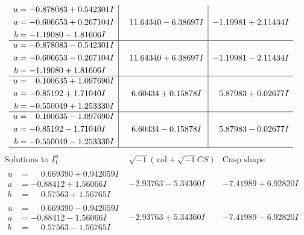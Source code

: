 \documentclass[1p]{elsarticle_modified}
\theoremstyle{definition}
\newcommand{\I}{\sqrt{-1}}
\begin{document}
$$\begin{array}{c|c|c}
\begin{aligned}
u &= -0.878083 + 0.542301 I \\
a &= -0.606653 + 0.267104 I \\
b &= -1.19080 - 1.81606 I\end{aligned}
 & \phantom{-}11.64340 - 6.38697 I & -1.19981 + 2.11434 I \\ \hline\begin{aligned}
u &= -0.878083 - 0.542301 I \\
a &= -0.606653 - 0.267104 I \\
b &= -1.19080 + 1.81606 I\end{aligned}
 & \phantom{-}11.64340 + 6.38697 I & -1.19981 - 2.11434 I \\ \hline\begin{aligned}
u &= \phantom{-}0.100635 + 1.097690 I \\
a &= -0.85192 + 1.71040 I \\
b &= -0.550049 + 1.253330 I\end{aligned}
 & \phantom{-}6.60434 + 0.15878 I & \phantom{-}5.87983 + 0.02677 I \\ \hline\begin{aligned}
u &= \phantom{-}0.100635 - 1.097690 I \\
a &= -0.85192 - 1.71040 I \\
b &= -0.550049 - 1.253330 I\end{aligned}
 & \phantom{-}6.60434 - 0.15878 I & \phantom{-}5.87983 - 0.02677 I\\
 \hline 
 \end{array}$$\newpage$$\begin{array}{c|c|c}  
\text{Solutions to }I^u_{1}& \I (\text{vol} + \sqrt{-1}CS) & \text{Cusp shape}\\
 \hline 
\begin{aligned}
u &= \phantom{-}0.669390 + 0.942059 I \\
a &= -0.88412 + 1.56066 I \\
b &= \phantom{-}0.57563 + 1.56765 I\end{aligned}
 & -2.93763 - 5.34360 I & -7.41989 + 6.92820 I \\ \hline\begin{aligned}
u &= \phantom{-}0.669390 - 0.942059 I \\
a &= -0.88412 - 1.56066 I \\
b &= \phantom{-}0.57563 - 1.56765 I\end{aligned}
 & -2.93763 + 5.34360 I & -7.41989 - 6.92820 I \\ \hline\begin{aligned}

\end{aligned}
\end{array}$$
\end{document}
